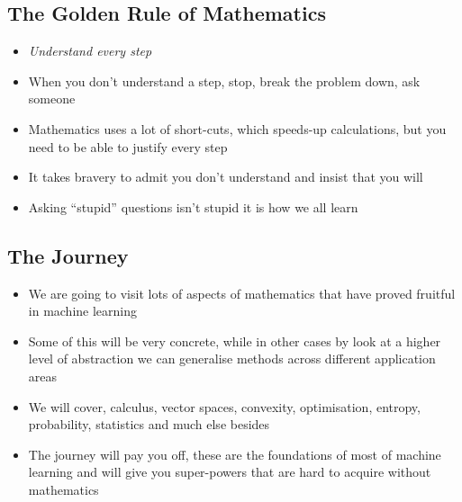 
\begin{slide}
\section{The Golden Rule of Mathematics}

\begin{PauseHighLight}
  \begin{itemize}
  \item \emph{Understand every step}\pause
  \item When you don't understand a step, stop\pause, break the
    problem down\pauseb, ask someone\pauseb
  \item Mathematics uses a lot of short-cuts\pause, which speeds-up
    calculations\pause, but you need to be able to justify every
    step\pauseb
  \item It takes bravery to admit you don't understand and insist that
    you will\pauseb
  \item Asking ``stupid'' questions isn't stupid\pauseb{} it is how we
    all learn\pauseb
  \end{itemize}
\end{PauseHighLight}

\end{slide}


\begin{slide}
\section{The Journey}

\begin{PauseHighLight}
  \begin{itemize}
  \item We are going to visit lots of aspects of mathematics that have
    proved fruitful in machine learning\pause
  \item Some of this will be very concrete, while in other cases by
    look at a higher level of abstraction we can generalise methods
    across different application areas\pause
  \item We will cover, calculus, vector spaces, convexity,
    optimisation, entropy, probability, statistics and much else
    besides\pause
  \item The journey will pay you off\pause, these are the foundations
    of most of machine learning and will give you super-powers that
    are hard to acquire without mathematics\pause
  \end{itemize}
\end{PauseHighLight}

\end{slide}


